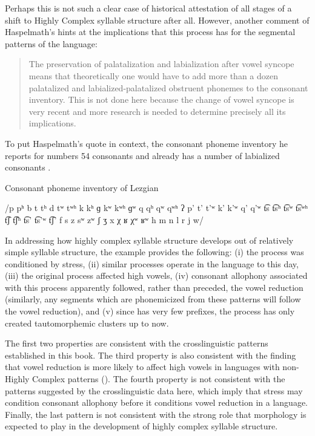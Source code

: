 Perhaps this is not such a clear case of historical attestation of all stages of a shift to Highly Complex syllable structure after all. However, another comment of Haspelmath’s hints at the implications that this process has for the segmental patterns of the language:\largerpage[-1]

\begin{quote}
The preservation of palatalization and labialization after vowel syncope means that theoretically one would have to add more than a dozen palatalized and labialized-palatalized obstruent phonemes to the consonant inventory. This is not done here because the change of vowel syncope is very recent and more research is needed to determine precisely all its implications.
\citep[38]{Haspelmath1993}
\end{quote}

To put Haspelmath’s quote in context, the consonant phoneme inventory he reports for  numbers 54 consonants and already has a number of labialized consonants .

\ea\label{ex:8.4}
Consonant phoneme inventory of Lezgian

/p pʰ b t tʰ d tʷ tʷʰ k kʰ ɡ kʷ kʷʰ ɡʷ q qʰ qʷ qʷʰ ʔ p’ t’ t’ʷ k’ k’ʷ q’ q’ʷ t͡s t͡sʰ t͡sʷ t͡sʷʰ t͡ʃ t͡ʃʰ t͡s’ t͡s’ʷ t͡ʃ’ f s z sʷ zʷ ʃ ʒ x χ ʁ χʷ ʁʷ h m n l r j w/
\z

  In addressing how highly complex syllable structure develops out of relatively simple syllable structure, the  example provides the following: (i) the process was conditioned by stress, (ii) similar processes operate in the language to this day, (iii) the original process affected high vowels, (iv) consonant allophony associated with this process apparently followed, rather than preceded, the vowel reduction (similarly, any segments which are phonemicized from these patterns will follow the vowel reduction), and (v) since  has very few prefixes, the process has only created tautomorphemic clusters up to now. 

  The first two properties are consistent with the crosslinguistic patterns established in this book. The third property is also consistent with the finding that vowel reduction is more likely to affect high vowels in languages with non-Highly Complex patterns (). The fourth property is not consistent with the patterns suggested by the crosslinguistic data here, which imply that stress may condition consonant allophony before it conditions vowel reduction in a language. Finally, the last pattern is not consistent with the strong role that morphology is expected to play in the development of highly complex syllable structure.

